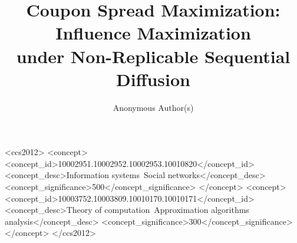 \documentclass[sigconf]{acmart}
\newcommand{\CRIM}{\textsc{CRIM}}
\begin{document}
\title{Coupon Spread Maximization: Influence Maximization\\
       under Non-Replicable Sequential Diffusion}

\author{Anonymous Author(s)}

\renewcommand{\shortauthors}{Anon.}

\begin{abstract}
\end{abstract}

\begin{CCSXML}
<ccs2012>
 <concept>
  <concept_id>10002951.10002952.10002953.10010820</concept_id>
  <concept_desc>Information systems~Social networks</concept_desc>
  <concept_significance>500</concept_significance>
 </concept>
 <concept>
  <concept_id>10003752.10003809.10010170.10010171</concept_id>
  <concept_desc>Theory of computation~Approximation algorithms analysis</concept_desc>
  <concept_significance>300</concept_significance>
 </concept>
</ccs2012>
\end{CCSXML}
\end{document}

